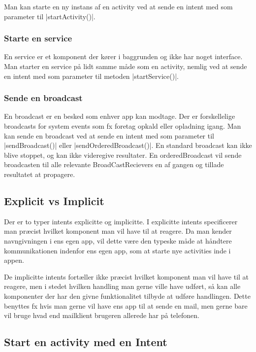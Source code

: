 Man kan starte en ny instans af en activity ved at sende en intent med som parameter til \JavaInline|startActivity()|. 

\subsubsection{Starte en service}

En service er et komponent der kører i baggrunden og ikke har noget interface. Man starter en service på lidt samme måde som en activity, nemlig ved at sende en intent med som parameter til metoden \JavaInline|startService()|.

\subsubsection{Sende en broadcast}

En broadcast er en besked som enhver app kan modtage. Der er forskellelige broadcasts for system events som fx foretag opkald eller opladning igang. Man kan sende en broadcast ved at sende en intent med som parameter til \JavaInline|sendBroadcast()| eller \JavaInline|sendOrderedBroadcast()|.
En standard broadcast kan ikke blive stoppet, og kan ikke videregive resultater. En orderedBroadcast vil sende broadcasten til alle relevante BroadCastRecievers en af gangen og tillade resultatet at propagere.

\subsection{Explicit vs Implicit}

Der er to typer intents explicitte og implicitte. I explicitte intents specificerer man præcist hvilket komponent man vil have til at reagere. Da man kender navngivningen i ens egen app, vil dette være den typeske måde at håndtere kommunikationen indenfor ens egen app, som at starte nye activities inde i appen.

De implicitte intents fortæller ikke præcist hvilket komponent man vil have til at reagere, men i stedet hvilken handling man gerne ville have udført, så kan alle komponenter der har den givne funktionalitet tilbyde at udføre handlingen. Dette benyttes fx hvis man gerne vil have ens app til at sende en mail, men gerne bare vil bruge hvad end mailklient brugeren allerede har på telefonen.

\subsection{Start en activity med en Intent}


